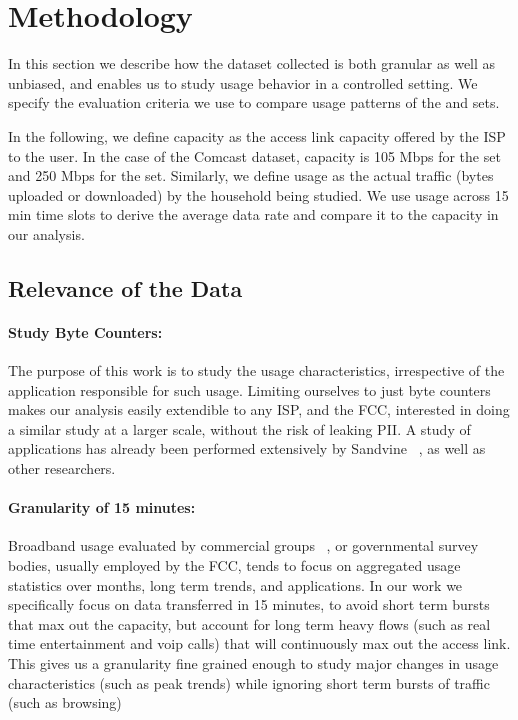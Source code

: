 \section{Methodology}
\label{sec:methodology}

In this section we describe how the dataset collected is both granular as well as unbiased, and enables us to study usage behavior in a controlled setting. We specify the evaluation criteria we use to compare usage patterns of the \test and \control sets.

In the following, we define capacity as the access link capacity offered by the ISP to the user. In the case of the Comcast dataset, capacity is 105 Mbps for the \control set and 250 Mbps for the \test set. Similarly, we define usage as the actual traffic (bytes uploaded or downloaded) by the household being studied. We use usage across 15 min time slots to derive the average data rate and compare it to the capacity in our analysis.

\subsection{Relevance of the Data}

\paragraph{Study Byte Counters:} The purpose of this work is to study the usage characteristics, irrespective of the application responsible for such usage. 
Limiting ourselves to just byte counters makes our analysis easily extendible to any ISP, and the FCC, interested in doing a similar study at a larger scale, without the risk of leaking PII. A study of applications has already been performed extensively by Sandvine ~\cite{}, as well as other researchers.

\paragraph{Granularity of 15 minutes:} Broadband usage evaluated by commercial groups ~\cite{}, or governmental survey bodies, usually employed by the FCC, tends to focus on aggregated usage statistics over months, long term trends, and applications. In our work we specifically focus on data transferred in 15 minutes, to avoid short term bursts that max out the capacity, but account for long term heavy flows (such as real time entertainment and voip calls) that will continuously max out the access link. This gives us a granularity fine grained enough to study major changes in usage characteristics (such as peak trends) while ignoring short term bursts of traffic (such as browsing)

